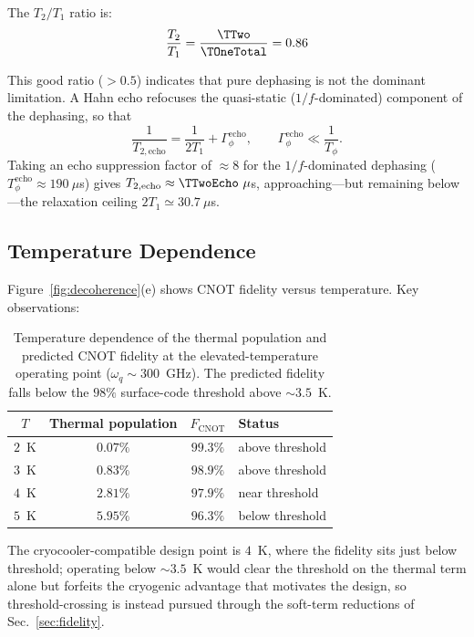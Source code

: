 The $T_2/T_1$ ratio is:
\begin{equation}
\frac{T_2}{T_1} = \frac{\TTwo}{\TOneTotal} = 0.86
\end{equation}

This good ratio ($> 0.5$) indicates that pure dephasing is not the dominant limitation. A Hahn echo refocuses the quasi-static ($1/f$-dominated) component of the dephasing, so that
\begin{equation}
\frac{1}{T_{2,\text{echo}}} = \frac{1}{2T_1} + \Gamma_{\phi}^{\text{echo}},
\qquad \Gamma_{\phi}^{\text{echo}} \ll \frac{1}{T_\phi}.
\end{equation}
Taking an echo suppression factor of $\approx 8$ for the $1/f$-dominated
dephasing ($T_\phi^{\text{echo}} \approx 190~\mu$s) gives
$T_{2,\text{echo}} \approx \TTwoEcho~\mu$s, approaching---but remaining
below---the relaxation ceiling $2T_1 \simeq 30.7~\mu$s.

\subsection{Temperature Dependence}

Figure~\ref{fig:decoherence}(e) shows CNOT fidelity versus temperature. Key observations:
\begin{table}[h]
\centering
\begin{tabular}{@{}cccl@{}}
\toprule
\textbf{$T$} & \textbf{Thermal population} & \textbf{$F_{\text{CNOT}}$} & \textbf{Status} \\
\midrule
$2$~K & $0.07\%$ & $99.3\%$ & above threshold \\
$3$~K & $0.83\%$ & $98.9\%$ & above threshold \\
$4$~K & $2.81\%$ & $97.9\%$ & near threshold \\
$5$~K & $5.95\%$ & $96.3\%$ & below threshold \\
\bottomrule
\end{tabular}
\caption{Temperature dependence of the thermal population and predicted CNOT
fidelity at the elevated-temperature operating point ($\omega_q\sim 300$~GHz). The
predicted fidelity falls below the $98\%$ surface-code threshold above
$\sim 3.5$~K.}
\label{tab:thermal_population_vs_T}
\end{table}

The cryocooler-compatible design point is $4$~K, where the fidelity sits just
below threshold; operating below $\sim 3.5$~K would clear the threshold on the
thermal term alone but forfeits the cryogenic advantage that motivates the
design, so threshold-crossing is instead pursued through the soft-term
reductions of Sec.~\ref{sec:fidelity}.

